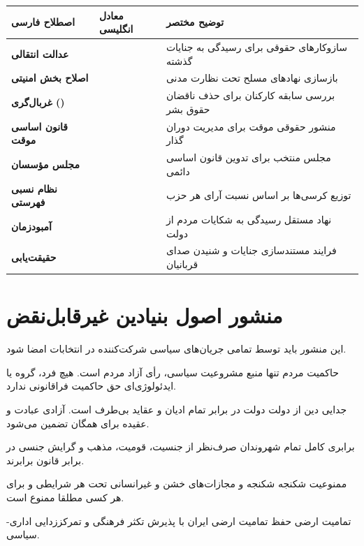 \begin{center}
\small
{}
\begin{tabular}{R{3.5cm} L{4.5cm} R{6cm}}
\hline
\textbf{اصطلاح فارسی} & \textbf{معادل انگلیسی} & \textbf{توضیح مختصر} \\
\hline
\textbf{عدالت انتقالی} &  & سازوکارهای حقوقی برای رسیدگی به جنایات گذشته \\
\textbf{اصلاح بخش امنیتی} &  & بازسازی نهادهای مسلح تحت نظارت مدنی \\
\textbf{غربال‌گری ()} &  & بررسی سابقه کارکنان برای حذف ناقضان حقوق بشر \\
\textbf{قانون اساسی موقت} &  & منشور حقوقی موقت برای مدیریت دوران گذار \\
\textbf{مجلس مؤسسان} &  & مجلس منتخب برای تدوین قانون اساسی دائمی \\
\textbf{نظام نسبی فهرستی} &  & توزیع کرسی‌ها بر اساس نسبت آرای هر حزب \\
\textbf{آمبودزمان} &  & نهاد مستقل رسیدگی به شکایات مردم از دولت \\
\textbf{حقیقت‌یابی} &  & فرایند مستندسازی جنایات و شنیدن صدای قربانیان \\
\hline
\end{tabular}
\end{center}

\section{منشور اصول بنیادین غیرقابل‌نقض}

این منشور باید توسط تمامی جریان‌های سیاسی شرکت‌کننده در انتخابات امضا شود.

\begin{principlebox}{حاکمیت مردم}
تنها منبع مشروعیت سیاسی، رأی آزاد مردم است. هیچ فرد، گروه یا ایدئولوژی‌ای حق حاکمیت فراقانونی ندارد.
\end{principlebox}

\begin{principlebox}{جدایی دین از دولت}
دولت در برابر تمام ادیان و عقاید بی‌طرف است. آزادی عبادت و عقیده برای همگان تضمین می‌شود.
\end{principlebox}

\begin{principlebox}{برابری کامل}
تمام شهروندان صرف‌نظر از جنسیت، قومیت، مذهب و گرایش جنسی در برابر قانون برابرند.
\end{principlebox}

\begin{principlebox}{ممنوعیت شکنجه}
شکنجه و مجازات‌های خشن و غیرانسانی تحت هر شرایطی و برای هر کسی مطلقا ممنوع است.
\end{principlebox}

\begin{principlebox}{تمامیت ارضی}
حفظ تمامیت ارضی ایران با پذیرش تکثر فرهنگی و تمرکززدایی اداری-سیاسی.
\end{principlebox}
